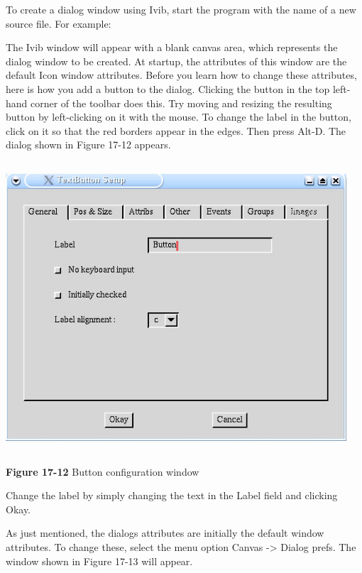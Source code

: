 To create a dialog window using Ivib, start the program with the name of
a new source file. For example:


The Ivib window will appear with a blank
{\textquotedbl}canvas{\textquotedbl} area, which represents the dialog
window to be created. At startup, the attributes of this window are the
default Icon window attributes. Before you learn how to change these
attributes, here is how you add a button to the dialog. Clicking the
button in the top left-hand corner of the toolbar does this. Try moving
and resizing the resulting button by left-clicking on it with the
mouse. To change the label in the button, click on it so that the red
borders appear in the edges. Then press Alt-D. The dialog shown in
Figure 17-12 appears.

\begin{center}
\includegraphics[width=5.0in,height=4.25in]{ub-img/ub-img61.jpg}
\end{center}

{\sffamily\bfseries Figure 17-12}
{\sffamily Button configuration window}

Change the label by simply changing the text in the
{\textquotedbl}Label{\textquotedbl} field and clicking
{\textquotedbl}Okay{\textquotedbl}.

As just mentioned, the dialog{\textquotesingle}s attributes are
initially the default window attributes. To change these, select the
menu option Canvas -{\textgreater} Dialog prefs. The window shown in
Figure 17-13 will appear.

